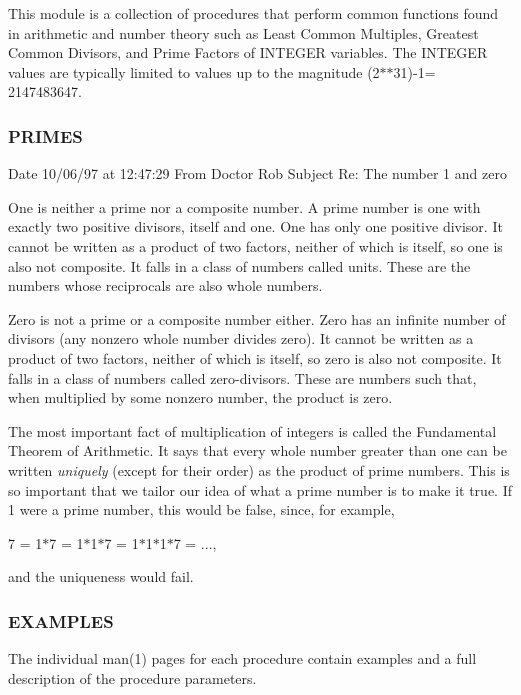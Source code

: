 This module is a collection of procedures that perform common functions found in arithmetic and number theory such as Least Common Multiples, Greatest Common Divisors, and Prime Factors of I\+N\+T\+E\+G\+ER variables. The I\+N\+T\+E\+G\+ER values are typically limited to values up to the magnitude (2$\ast$$\ast$31)-\/1= 2147483647.

\subsubsection*{P\+R\+I\+M\+ES}

Date 10/06/97 at 12\+:47\+:29 From Doctor Rob Subject Re\+: The number 1 and zero

One is neither a prime nor a composite number. A prime number is one with exactly two positive divisors, itself and one. One has only one positive divisor. It cannot be written as a product of two factors, neither of which is itself, so one is also not composite. It falls in a class of numbers called units. These are the numbers whose reciprocals are also whole numbers.

Zero is not a prime or a composite number either. Zero has an infinite number of divisors (any nonzero whole number divides zero). It cannot be written as a product of two factors, neither of which is itself, so zero is also not composite. It falls in a class of numbers called zero-\/divisors. These are numbers such that, when multiplied by some nonzero number, the product is zero.

The most important fact of multiplication of integers is called the Fundamental Theorem of Arithmetic. It says that every whole number greater than one can be written {\itshape uniquely} (except for their order) as the product of prime numbers. This is so important that we tailor our idea of what a prime number is to make it true. If 1 were a prime number, this would be false, since, for example,

7 = 1$\ast$7 = 1$\ast$1$\ast$7 = 1$\ast$1$\ast$1$\ast$7 = ...,

and the uniqueness would fail.

\subsubsection*{E\+X\+A\+M\+P\+L\+ES}

\begin{DoxyVerb} The individual man(1) pages for each procedure contain examples and
 a full description of the procedure parameters. \end{DoxyVerb}
 

